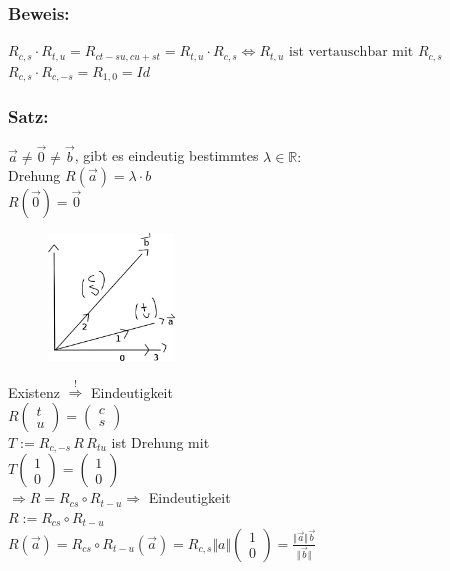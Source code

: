 %
\subsubsection{Beweis:}
$R_{c,s} \cdot R_{t,u}=R_{ct-su,cu+st}=R_{t,u} \cdot R_{c,s} \Leftrightarrow R_{t,u}\textrm{ ist vertauschbar mit } R_{c,s}$ \\
$R_{c,s}\cdot R_{c,-s} = R_{1,0} = Id$\\
%
%
%
\subsubsection{Satz:}
$\vec{a} \neq \vec{0} \neq \vec{b}$, gibt es eindeutig bestimmtes $\lambda \in \mathbb{R}:$\\
Drehung $ R(\vec{a})=\lambda \cdot b$\\
$R(\vec{0})=\vec{0}$\\
%
\begin{figure}[H]
\centering
\includegraphics[width=0.3\textwidth]{mainmatter/chapter1/pics/bewegung3.png}
\end{figure}
%
Existenz $\mathop{\Rightarrow}\limits^{\text{!}}$ Eindeutigkeit\\
$R\begin{pmatrix} t \\ u \end{pmatrix} = \begin{pmatrix} c \\ s \end{pmatrix}$\\
$T:= R_{c,-s} \, R \, R_{tu}$ ist Drehung mit\\
$T\begin{pmatrix} 1 \\ 0 \end{pmatrix} = \begin{pmatrix} 1 \\ 0 \end{pmatrix}$\\
$\Rightarrow R = R_{cs} \circ R_{t-u} \Rightarrow$ Eindeutigkeit \\
$R:= R_{cs} \circ R_{t-u}$\\
$R(\vec{a}) = R_{cs} \circ R_{t-u} (\vec{a}) = R_{c,s} \Vert a \Vert \begin{pmatrix} 1 \\ 0 \end{pmatrix} = \frac{\Vert \vec{a}\Vert \vec{b}}{\Vert \vec{b} \Vert}$
%
%
%
